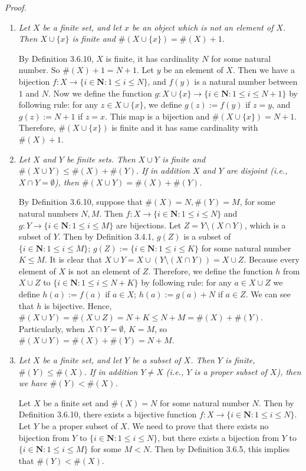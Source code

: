 \documentclass{book}
\newcommand{\pff}{\vspace{.25em}\noindent\emph{Proof.}~~}
\begin{document}
\pff
\begin{enumerate}
    \item \emph{Let $X$ be a finite set, and let $x$ be an object which is not an element of $X$. Then $X\cup\{x\}$ is finite and $\#(X\cup\{x\})=\#(X)+1$.}

    By Definition 3.6.10, $X$ is finite, it has cardinality $N$ for some natural number. So $\#(X)+1=N+1$. Let $y$ be an element of $X$. Then we have a bijection $f:X\to\{i\in\mathbf{N}:1\leq i\leq N\}$, and $f(y)$ is a natural number between $1$ and $N$. Now we define the function $g:X\cup\{x\}\to\{i\in\mathbf{N}:1\leq i\leq N+1\}$ by following rule: for any $z\in X\cup\{x\}$, we define $g(z):=f(y)$ if $z=y$, and $g(z):=N+1$ if $z=x$. This map is a bijection and $\#(X\cup\{x\})=N+1$. Therefore, $\#(X\cup\{x\})$ is finite and it has same cardinality with $\#(X)+1$.

    \item \emph{Let $X$ and $Y$ be finite sets. Then $X\cup Y$ is finite and $\#(X\cup Y)\leq\#(X)+\#(Y)$. If in addition $X$ and $Y$ are disjoint (i.e., $X\cap Y=\emptyset$), then $\#(X\cup Y)=\#(X)+\#(Y)$.}

    By Definition 3.6.10, suppose that $\#(X)=N,\#(Y)=M$, for some natural numbers $N,M$. Then $f:X\to\{i\in\mathbf{N}:1\leq i\leq N\}$ and $g:Y\to\{i\in\mathbf{N}:1\leq i\leq M\}$ are bijections. Let $Z=Y\setminus(X\cap Y)$, which is a subset of $Y$. Then by Definition 3.4.1, $g(Z)$ is a subset of $\{i\in\mathbf{N}:1\leq i\leq M\}$; $g(Z):=\{i\in\mathbf{N}:1\leq i\leq K\}$ for some natural number $K\leq M$. It is clear that $X\cup Y=X\cup(Y\setminus(X\cap Y))=X\cup Z$. Because every element of $X$ is not an element of $Z$. Therefore, we define the function $h$ from $X\cup Z$ to $\{i\in\mathbf{N}:1\leq i\leq N+K\}$ by following rule: for any $a\in X\cup Z$ we define $h(a):=f(a)$ if $a\in X$; $h(a):=g(a)+N$ if $a\in Z$. We can see that $h$ is bijective. Hence, $\#(X\cup Y)=\#(X\cup Z)=N+K\leq N+M=\#(X)+\#(Y)$. Particularly, when $X\cap Y=\emptyset$, $K=M$, so $\#(X\cup Y)=\#(X)+\#(Y)=N+M$.

    \item \emph{Let $X$ be a finite set, and let $Y$ be a subset of $X$. Then $Y$ is finite, $\#(Y)\leq\#(X)$. If in addition $Y\neq X$ (i.e., $Y$ is a proper subset of $X$), then we have $\#(Y)<\#(X)$.}

    Let $X$ be a finite set and $\#(X)=N$ for some natural number $N$. Then by Definition 3.6.10, there exists a bijective function $f:X\to\{i\in\mathbf{N}:1\leq i\leq N\}$. Let $Y$ be a proper subset of $X$. We need to prove that there exists no bijection from $Y$ to $\{i\in\mathbf{N}:1\leq i\leq N\}$, but there exists a bijection from $Y$ to $\{i\in\mathbf{N}:1\leq i\leq M\}$ for some $M<N$. Then by Definition 3.6.5, this implies that $\#(Y)<\#(X)$.


\end{enumerate}
\end{document}
